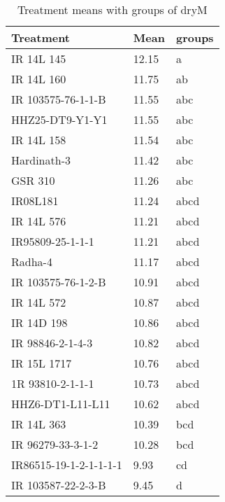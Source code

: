 \documentclass[]{article}
\begin{document}
\begin{longtable}{lll}
\caption{\label{tab:two-fac-groups-tab2}Treatment means with groups of dryM}\\
\toprule
Treatment & Mean & groups\\
\midrule
\rowcolor{gray!6}  IR 14L 145 & 12.15 & a\\
IR 14L 160 & 11.75 & ab\\
\rowcolor{gray!6}  IR 103575-76-1-1-B & 11.55 & abc\\
HHZ25-DT9-Y1-Y1 & 11.55 & abc\\
\rowcolor{gray!6}  IR 14L 158 & 11.54 & abc\\
\addlinespace
Hardinath-3 & 11.42 & abc\\
\rowcolor{gray!6}  GSR 310 & 11.26 & abc\\
IR08L181 & 11.24 & abcd\\
\rowcolor{gray!6}  IR 14L 576 & 11.21 & abcd\\
IR95809-25-1-1-1 & 11.21 & abcd\\
\addlinespace
\rowcolor{gray!6}  Radha-4 & 11.17 & abcd\\
IR 103575-76-1-2-B & 10.91 & abcd\\
\rowcolor{gray!6}  IR 14L 572 & 10.87 & abcd\\
IR 14D 198 & 10.86 & abcd\\
\rowcolor{gray!6}  IR 98846-2-1-4-3 & 10.82 & abcd\\
\addlinespace
IR 15L 1717 & 10.76 & abcd\\
\rowcolor{gray!6}  1R 93810-2-1-1-1 & 10.73 & abcd\\
HHZ6-DT1-L11-L11 & 10.62 & abcd\\
\rowcolor{gray!6}  IR 14L 363 & 10.39 & bcd\\
IR 96279-33-3-1-2 & 10.28 & bcd\\
\addlinespace
\rowcolor{gray!6}  IR86515-19-1-2-1-1-1-1 & 9.93 & cd\\
IR 103587-22-2-3-B & 9.45 & d\\
\bottomrule
\end{longtable}
\endgroup{}
\begingroup\fontsize{12}{14}\selectfont
\end{document}
